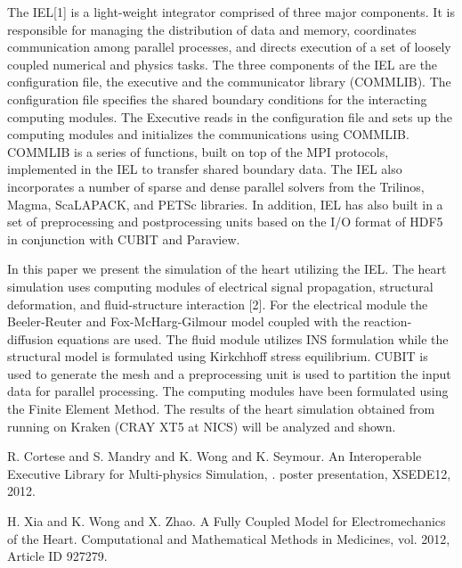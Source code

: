 \documentclass[article, A4, 11pt]{llncs}%
\begin{document}
The IEL[1] is a light-weight integrator comprised of three major components.  It is responsible for managing the distribution of data and memory, coordinates communication among parallel processes, and directs execution of a set of loosely coupled numerical and physics tasks. The three components of the IEL are the configuration file, the executive and the communicator library (COMMLIB). The configuration file specifies the shared boundary conditions for the interacting computing modules. The Executive reads in the configuration file and sets up the computing modules and initializes the communications using COMMLIB. COMMLIB is a series of functions, built on top of the MPI protocols, implemented in the IEL to transfer shared boundary data. The IEL also incorporates a number of sparse and dense parallel solvers from the Trilinos, Magma, ScaLAPACK, and PETSc libraries. In addition, IEL has also built in a set of preprocessing and postprocessing units based on the I/O format of HDF5 in conjunction with CUBIT and Paraview. 
 
In this paper we present the simulation of the heart utilizing the IEL. The heart simulation uses computing modules of electrical signal propagation, structural deformation, and fluid-structure interaction [2]. For the electrical module the Beeler-Reuter and Fox-McHarg-Gilmour model coupled with the reaction-diffusion equations are used. The fluid module utilizes INS formulation while the structural model is formulated using Kirkchhoff stress equilibrium. CUBIT is used to generate the mesh and a preprocessing unit is used to partition the input data for parallel processing. The computing modules have been formulated using the Finite Element Method. The results of the heart simulation obtained from running on Kraken (CRAY XT5 at NICS) will be analyzed and shown.



\begin{thebibliography}{10}
{\sc R. Cortese and S. Mandry and K. Wong and K. Seymour}. {An Interoperable Executive Library for Multi-physics Simulation, }. poster presentation, XSEDE12, 2012.

{\sc H. Xia and K. Wong and X. Zhao}. {A Fully Coupled Model for Electromechanics of the Heart}. Computational and Mathematical Methods in Medicines, vol. 2012, Article ID 927279.
\end{thebibliography} %
\end{document}
